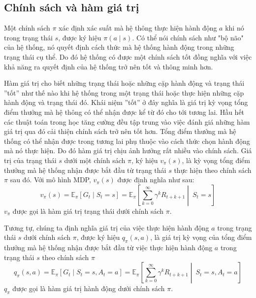 
\subsection{Chính sách và hàm giá trị} \label{sec:policy_value}
Một chính sách $\pi$ xác định xác suất mà hệ thông thực hiện hành động $a$ khi nó trong trạng thái $s$, được ký hiệu $\pi(a \mid s)$. Có thể nói chính sách như "bộ não" của hệ thống, nó quyết định cách thức mà hệ thống hành động trong những trạng thái cụ thể. Do đó hệ thống có được một chính sách tốt đồng nghĩa với việc khả năng ra quyết định của hệ thống trở nên tốt và thông minh hơn.

Hàm giá trị cho biết những trạng thái hoặc những cặp hành động và trạng thái ''tốt'' như thế nào khi hệ thống trong một trạng thái hoặc thực hiện những cặp hành động và trạng thái đó. Khái niệm ''tốt'' ở đây nghĩa là giá trị kỳ vọng tổng điểm thưởng mà hệ thông có thể nhận được kể từ đó cho tới tương lai. Hầu hết các thuật toán trong học tăng cường đều tập trung vào việc đánh giá những hàm giá trị qua đó cải thiện chính sách trở nên tốt hơn. Tổng điểm thưởng mà hệ thống có thể nhận được trong tương lai phụ thuộc vào cách thức chọn hành động mà nó thực hiện. Do đó hàm giá trị chịu ảnh hưởng rất nhiều vào chính sách. Giá trị của trạng thái $s$ dưới một chính sách $\pi$, ký hiệu $v_{\pi}(s)$, là kỳ vọng tổng điểm thưởng mà hệ thống nhận được bắt đầu từ trạng thái $s$ thực hiện theo chính sách $\pi$ sau đó. Với mô hình MDP, $v_{\pi}(s)$ được định nghĩa như sau:
\begin{equation}
v_{\pi}(s) = \mathbb{E}_{\pi}\left [\mathit{G}_t \mid \mathit{S}_{t} = s\right ] = \mathbb{E}_{\pi}\left [\sum_{k = 0}^{\infty}\gamma^{k}\mathit{R}_{t+k+1} \middle|\ \mathit{S}_t= s\right ]
\end{equation}
$v_{\pi}$ được gọi là hàm giá trị trạng thái dưới chính sách $\pi$.

Tương tự, chúng ta định nghĩa giá trị của việc thực hiện hành động $a$ trong trạng thái $s$ dưới chính sách $\pi$, được ký hiệu $q_{\pi}(s,a)$, là giá trị kỳ vọng của tổng điểm thưởng mà hệ thống nhận được bắt đầu từ việc thực hiện hành động $a$ trong trạng thái $s$ theo chính sách $\pi$
\begin{equation}
\label{action_value}
q_{\pi}(s,a) = \mathbb{E}_{\pi}\left [\mathit{G}_t \mid \mathit{S}_{t} = s, \mathit{A}_{t} = a  \right ] = \mathbb{E}_{\pi}\left [\sum_{k = 0}^{\infty}\gamma^{k}\mathit{R}_{t+k+1} \middle|\ \mathit{S}_t= s, \mathit{A}_{t} = a \right ]
\end{equation}
$q_{\pi}$ được gọi là hàm giá trị hành động dưới chính sách $\pi$.

